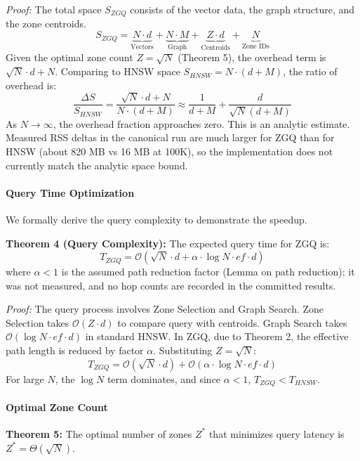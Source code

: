 \documentclass[conference]{IEEEtran}
\begin{document}
\textit{Proof:} The total space $S_{ZGQ}$ consists of the vector data, the graph structure, and the zone centroids.
\begin{equation}
S_{ZGQ} = \underbrace{N \cdot d}_{\text{Vectors}} + \underbrace{N \cdot M}_{\text{Graph}} + \underbrace{Z \cdot d}_{\text{Centroids}} + \underbrace{N}_{\text{Zone IDs}}
\end{equation}
Given the optimal zone count $Z = \sqrt{N}$ (Theorem 5), the overhead term is $\sqrt{N} \cdot d + N$.
Comparing to HNSW space $S_{HNSW} = N \cdot (d + M)$, the ratio of overhead is:
\begin{equation}
\frac{\Delta S}{S_{HNSW}} = \frac{\sqrt{N} \cdot d + N}{N \cdot (d + M)} \approx \frac{1}{d+M} + \frac{d}{\sqrt{N}(d+M)}
\end{equation}
As $N \to \infty$, the overhead fraction approaches zero. This is an analytic estimate. Measured RSS deltas in the canonical run are much larger for ZGQ than for HNSW (about 820 MB vs 16 MB at 100K), so the implementation does not currently match the analytic space bound.

\paragraph{Query Time Optimization}
We formally derive the query complexity to demonstrate the speedup.

\textbf{Theorem 4 (Query Complexity):} The expected query time for ZGQ is:
\begin{equation}
T_{ZGQ} = \mathcal{O}(\sqrt{N} \cdot d + \alpha \cdot \log N \cdot ef \cdot d)
\end{equation}
where $\alpha < 1$ is the assumed path reduction factor (Lemma on path reduction); it was not measured, and no hop counts are recorded in the committed results.

\textit{Proof:} The query process involves Zone Selection and Graph Search.
Zone Selection takes $\mathcal{O}(Z \cdot d)$ to compare query with centroids.
Graph Search takes $\mathcal{O}(\log N \cdot ef \cdot d)$ in standard HNSW. In ZGQ, due to Theorem 2, the effective path length is reduced by factor $\alpha$.
Substituting $Z = \sqrt{N}$:
\begin{equation}
T_{ZGQ} = \mathcal{O}(\sqrt{N} \cdot d) + \mathcal{O}(\alpha \cdot \log N \cdot ef \cdot d)
\end{equation}
For large $N$, the $\log N$ term dominates, and since $\alpha < 1$, $T_{ZGQ} < T_{HNSW}$.

\paragraph{Optimal Zone Count}
\textbf{Theorem 5:} The optimal number of zones $Z^*$ that minimizes query latency is $Z^* = \Theta(\sqrt{N})$.
\end{document}
